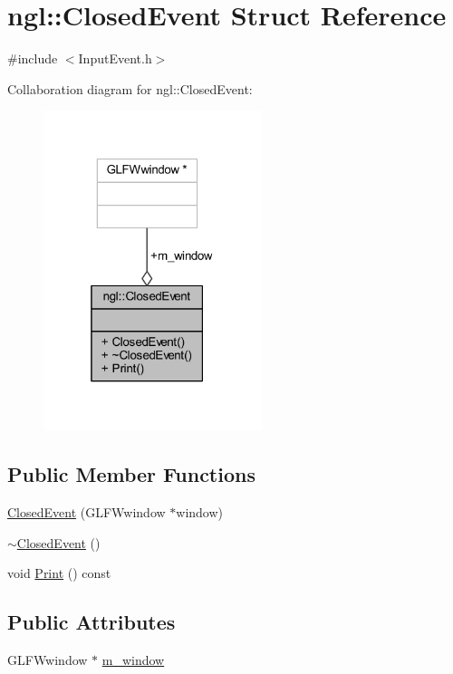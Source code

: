 \hypertarget{structngl_1_1_closed_event}{}\section{ngl\+:\+:Closed\+Event Struct Reference}
\label{structngl_1_1_closed_event}


{\ttfamily \#include $<$Input\+Event.\+h$>$}



Collaboration diagram for ngl\+:\+:Closed\+Event\+:
\nopagebreak
\begin{figure}[H]
\begin{center}
\leavevmode
\includegraphics[width=181pt]{structngl_1_1_closed_event__coll__graph}
\end{center}
\end{figure}
\subsection*{Public Member Functions}
\begin{DoxyCompactItemize}
\item 
\mbox{\hyperlink{structngl_1_1_closed_event_a33d04faa590f0ec0d7c9473ac57c0427}{Closed\+Event}} (G\+L\+F\+Wwindow $\ast$window)
\item 
\mbox{\hyperlink{structngl_1_1_closed_event_a598e10f3391323b2ad3a42697ffbd67e}{$\sim$\+Closed\+Event}} ()
\item 
void \mbox{\hyperlink{structngl_1_1_closed_event_a2b168c2666cc9e3e12eb9ee1b62520fb}{Print}} () const
\end{DoxyCompactItemize}
\subsection*{Public Attributes}
\begin{DoxyCompactItemize}
\item 
G\+L\+F\+Wwindow $\ast$ \mbox{\hyperlink{structngl_1_1_closed_event_a18bca3d4f9c90ed025f09d952854c5bc}{m\+\_\+window}}
\end{DoxyCompactItemize}


